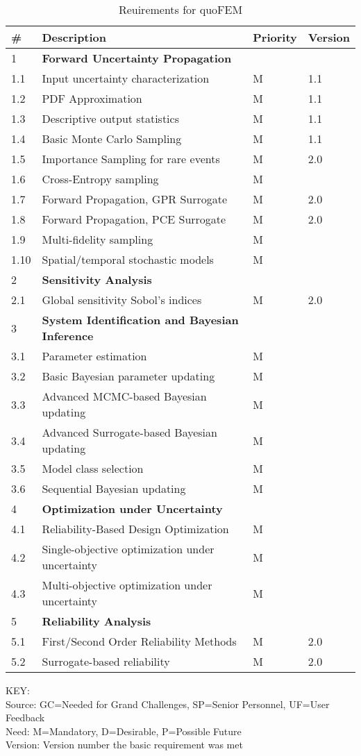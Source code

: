 \begin{longtable}{| p{} | p{} | p{} | p{} |}

\caption{Reuirements for quoFEM}             
  \label{tab:featureQuo_FEM}     
     \\
   \hline
\rowcolor{lightgray}

      \# & Description & Priority & Version \\ \hline
      1 & \textbf{Forward Uncertainty Propagation} &  &  \\ 
	1.1 & Input uncertainty characterization & M & 1.1 \\ \hline
	1.2 & PDF Approximation & M & 1.1 \\ \hline
	1.3 &  Descriptive output statistics & M & 1.1 \\ \hline
	1.4 &  Basic Monte Carlo Sampling  & M & 1.1 \\ \hline	
	1.5 &  Importance Sampling for rare events  & M & 2.0 \\ \hline	
	1.6 &  Cross-Entropy sampling  & M &  \\ \hline
	1.7 &  Forward Propagation, GPR Surrogate  & M & 2.0 \\ \hline
	1.8 &  Forward Propagation, PCE Surrogate  & M & 2.0 \\ \hline
	1.9 &  Multi-fidelity sampling  & M &  \\ \hline
	1.10 &  Spatial/temporal stochastic models  & M &  \\ \hline
	2 & \textbf{Sensitivity Analysis} &  &  \\ \hline
	2.1 & Global sensitivity Sobol's indices & M & 2.0  \\ \hline
	3 & \textbf{System Identification and Bayesian Inference} &  &  \\ \hline
	3.1 & Parameter estimation & M &  \\ \hline
	3.2 & Basic Bayesian parameter updating & M &  \\ \hline
	3.3 & Advanced MCMC-based Bayesian updating & M & \\ \hline
	3.4 & Advanced Surrogate-based Bayesian updating & M &  \\ \hline
	3.5 & Model class selection & M &  \\ \hline
	3.6 & Sequential Bayesian updating & M &  \\ \hline
	4 & \textbf{Optimization under Uncertainty} &  &  \\ \hline
	4.1 & Reliability-Based Design Optimization & M &  \\ \hline
	4.2 & Single-objective optimization under uncertainty & M &  \\ \hline
	4.3 & Multi-objective optimization under uncertainty & M &  \\ \hline
	5 & \textbf{Reliability Analysis} &  &  \\ \hline
	5.1 & First/Second Order Reliability Methods & M & 2.0 \\ \hline
	5.2 & Surrogate-based reliability & M & 2.0 \\ \hline
	\bottomrule
            
\end{longtable}

\noindent
KEY:\\
Source: GC=Needed for Grand Challenges, SP=Senior Personnel, UF=User Feedback \\
Need: M=Mandatory, D=Desirable, P=Possible Future \\
Version: Version number the basic requirement was met 
